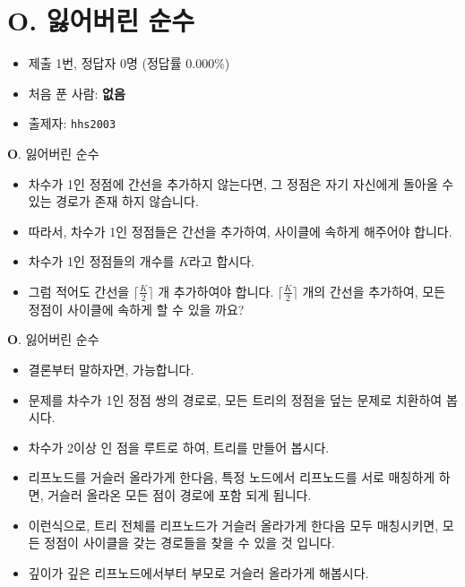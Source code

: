 \section{O. 잃어버린 순수}

\begin{frame} %
    \begin{itemize}
        \item 제출 1번, 정답자 0명 (정답률 0.000\%)
        \item 처음 푼 사람: \textbf{없음}
        \item 출제자: \texttt{hhs2003}
    \end{itemize}
\end{frame}

\begin{frame}{\textbf{O}. 잃어버린 순수}
    \begin{itemize}
        \item 차수가 1인 정점에 간선을 추가하지 않는다면, 그 정점은 자기 자신에게 돌아올 수 있는 경로가 존재 하지 않습니다.
        \item 따라서, 차수가 1인 정점들은 간선을 추가하여, 사이클에 속하게 해주어야 합니다.
        \item 차수가 1인 정점들의 개수를 $K$라고 합시다.
        \item 그럼 적어도 간선을 $ \lceil \frac{K}{2}\rceil$ 개 추가하여야 합니다.  $ \lceil \frac{K}{2}\rceil$ 개의 간선을 추가하여, 모든 정점이 사이클에 속하게 할 수 있을 까요?
    \end{itemize}
\end{frame}

\begin{frame}{\textbf{O}. 잃어버린 순수}
    \begin{itemize}
        \item 결론부터 말하자면, 가능합니다.
        \item 문제를 차수가 1인 정점 쌍의 경로로, 모든 트리의 정점을 덮는 문제로 치환하여 봅시다.
        \item 차수가 2이상 인 점을 루트로 하여, 트리를 만들어 봅시다.
        \item 리프노드를 거슬러 올라가게 한다음, 특정 노드에서 리프노드를 서로 매칭하게 하면, 거슬러 올라온 모든 점이 경로에 포함 되게 됩니다.
        \item 이런식으로, 트리 전체를 리프노드가 거슬러 올라가게 한다음 모두 매칭시키면, 모든 정점이 사이클을 갖는 경로들을 찾을 수 있을 것 입니다.
        \item 깊이가 깊은 리프노드에서부터 부모로 거슬러 올라가게 해봅시다.
    \end{itemize}
\end{frame}

